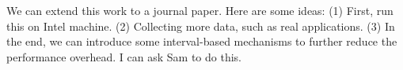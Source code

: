 We can extend this work to a journal paper.
Here are some ideas:
(1) First, run this on Intel machine. 
(2) Collecting more data, such as real applications. 
(3) In the end, we can introduce some interval-based mechanisms to further reduce the performance overhead. 
I can ask Sam to do this.
